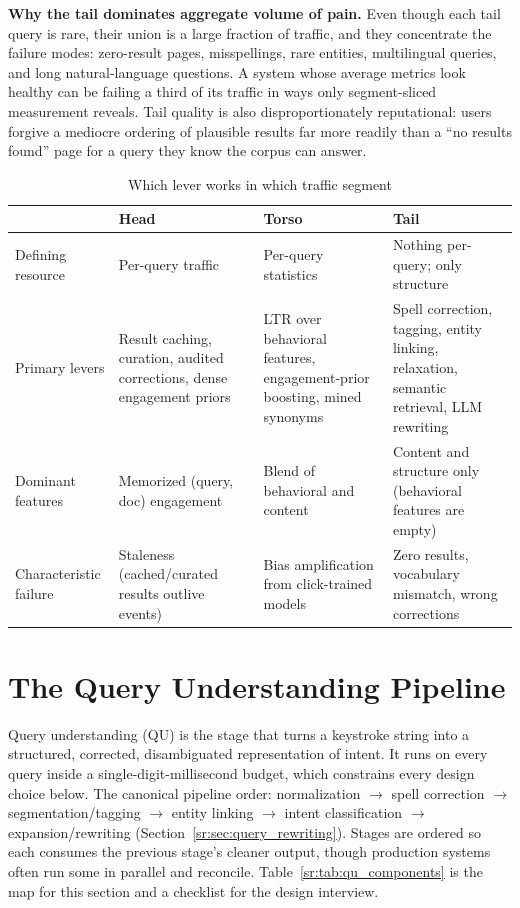 \textbf{Why the tail dominates aggregate volume of pain.} Even though each tail query is rare, their union is a large fraction of traffic, and they concentrate the failure modes: zero-result pages, misspellings, rare entities, multilingual queries, and long natural-language questions. A system whose average metrics look healthy can be failing a third of its traffic in ways only segment-sliced measurement reveals. Tail quality is also disproportionately reputational: users forgive a mediocre ordering of plausible results far more readily than a ``no results found'' page for a query they know the corpus can answer.

\begin{table}[H]
\centering
\small
\caption{Which lever works in which traffic segment}
\label{sr:tab:segment_levers}
\begin{tabularx}{\textwidth}{lXXX}
\toprule
 & \textbf{Head} & \textbf{Torso} & \textbf{Tail} \\
\midrule
Defining resource & Per-query traffic & Per-query statistics & Nothing per-query; only structure \\
Primary levers & Result caching, curation, audited corrections, dense engagement priors & LTR over behavioral features, engagement-prior boosting, mined synonyms & Spell correction, tagging, entity linking, relaxation, semantic retrieval, LLM rewriting \\
Dominant features & Memorized (query, doc) engagement & Blend of behavioral and content & Content and structure only (behavioral features are empty) \\
Characteristic failure & Staleness (cached/curated results outlive events) & Bias amplification from click-trained models & Zero results, vocabulary mismatch, wrong corrections \\
\bottomrule
\end{tabularx}
\end{table}

\section{The Query Understanding Pipeline}
\label{sr:sec:qu_pipeline}

Query understanding (QU) is the stage that turns a keystroke string into a structured, corrected, disambiguated representation of intent. It runs on every query inside a single-digit-millisecond budget, which constrains every design choice below. The canonical pipeline order: normalization $\to$ spell correction $\to$ segmentation/tagging $\to$ entity linking $\to$ intent classification $\to$ expansion/rewriting (Section~\ref{sr:sec:query_rewriting}). Stages are ordered so each consumes the previous stage's cleaner output, though production systems often run some in parallel and reconcile. Table~\ref{sr:tab:qu_components} is the map for this section and a checklist for the design interview.

